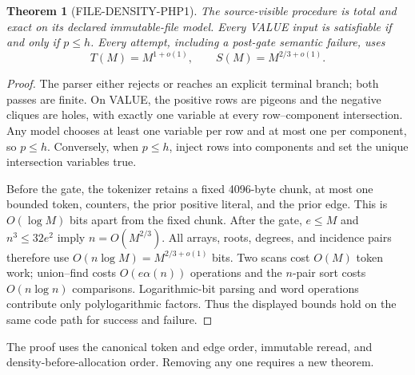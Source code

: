 \documentclass[11pt]{article}
\newtheorem{theorem}{Theorem}
\begin{document}
\begin{theorem}[FILE-DENSITY-PHP1]
The source-visible procedure is total and exact on its declared immutable-file
model.  Every VALUE input is satisfiable if and only if $p\le h$.  Every
attempt, including a post-gate semantic failure, uses
\[
 T(M)=M^{1+o(1)},\qquad S(M)=M^{2/3+o(1)}.
\]
\end{theorem}
\begin{proof}
The parser either rejects or reaches an explicit terminal branch; both passes
are finite.  On VALUE, the positive rows are pigeons and the negative cliques
are holes, with exactly one variable at every row--component intersection.
Any model chooses at least one variable per row and at most one per component,
so $p\le h$.  Conversely, when $p\le h$, inject rows into components and set
the unique intersection variables true.

Before the gate, the tokenizer retains a fixed 4096-byte chunk, at most one
bounded token, counters, the prior positive literal, and the prior edge.  This
is $O(\log M)$ bits apart from the fixed chunk.  After the gate,
$e\le M$ and $n^3\le32e^2$ imply $n=O(M^{2/3})$.  All arrays, roots, degrees,
and incidence pairs therefore use $O(n\log M)=M^{2/3+o(1)}$ bits.  Two scans
cost $O(M)$ token work; union--find costs $O(e\alpha(n))$ operations and the
$n$-pair sort costs $O(n\log n)$ comparisons.  Logarithmic-bit parsing and
word operations contribute only polylogarithmic factors.  Thus the displayed
bounds hold on the same code path for success and failure.
\end{proof}

The proof uses the canonical token and edge order, immutable reread, and
density-before-allocation order.  Removing any one requires a new theorem.
\end{document}
